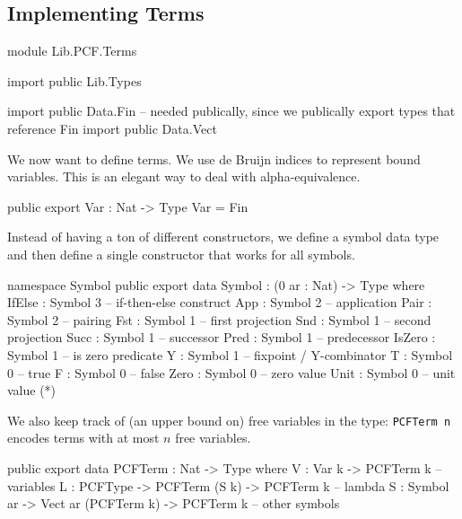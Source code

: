 \subsection{Implementing Terms}

\begin{hidden}
module Lib.PCF.Terms

import public Lib.Types

import public Data.Fin  -- needed publically, since we publically export types that reference Fin
import public Data.Vect

\end{hidden}

We now want to define terms. We use de Bruijn indices to represent bound variables.
This is an elegant way to deal with alpha-equivalence.

\begin{code}
public export
Var : Nat -> Type
Var = Fin
\end{code}

Instead of having a ton of different constructors, we define a symbol data type
and then define a single constructor that works for all symbols.

\begin{code}
namespace Symbol
  public export
  data Symbol : (0 ar : Nat) -> Type where
    IfElse : Symbol 3       -- if-then-else construct
    App    : Symbol 2       -- application
    Pair   : Symbol 2       -- pairing
    Fst    : Symbol 1       -- first projection
    Snd    : Symbol 1       -- second projection
    Succ   : Symbol 1       -- successor
    Pred   : Symbol 1       -- predecessor
    IsZero : Symbol 1       -- is zero predicate
    Y      : Symbol 1       -- fixpoint / Y-combinator
    T      : Symbol 0       -- true
    F      : Symbol 0       -- false
    Zero   : Symbol 0       -- zero value
    Unit   : Symbol 0       -- unit value (*)
\end{code}

We also keep track of (an upper bound on) free variables in the type:
\lstinline{PCFTerm n} encodes terms with at most $n$ free variables.

\begin{code}
public export
data PCFTerm : Nat -> Type where
  V    : Var k -> PCFTerm k                             -- variables
  L    : PCFType   -> PCFTerm (S k) -> PCFTerm k        -- lambda
  S    : Symbol ar -> Vect ar (PCFTerm k) -> PCFTerm k  -- other symbols
\end{code}

